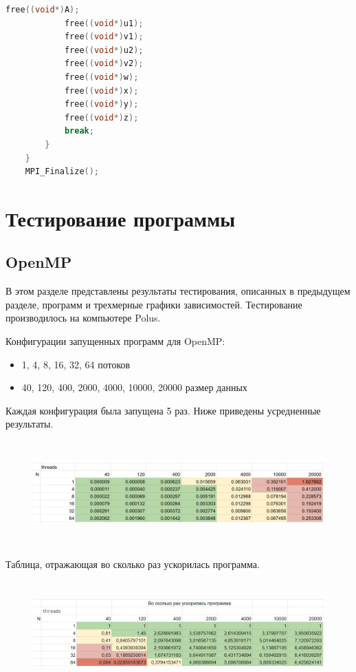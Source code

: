 \documentclass{article}
\begin{document}
\begin{lstlisting}[language = C]
            free((void*)A);
            free((void*)u1);
            free((void*)v1);
            free((void*)u2);
            free((void*)v2);
            free((void*)w);
            free((void*)x);
            free((void*)y);
            free((void*)z);
            break;
        }
    }
    MPI_Finalize();
\end{lstlisting}

\section{Тестирование программы}
\subsection{OpenMP}
В этом разделе представлены результаты тестирования, описанных в
предыдущем разделе, программ и трехмерные графики зависимостей. Тестирование
производилось на компьютере Polus.

\vspace{0.5cm}
Конфигурации запущенных программ для OpenMP:
\begin{itemize}
    \item 1, 4, 8, 16, 32, 64 потоков
    \item 40, 120, 400, 2000, 4000, 10000, 20000 размер данных
\end{itemize}

\newpage

Каждая конфигурация была запущена 5 раз. Ниже приведены усредненные результаты.

\begin{figure}[H]
    \centering
    \includegraphics[width=13cm,height=4cm]{omp_res.png}
\end{figure}

Таблица, отражающая во сколько раз ускорилась программа.

\begin{figure}[H]
    \centering
    \includegraphics[width=13cm,height=4cm]{omp_speed_up.png}
\end{figure}
\end{document}
